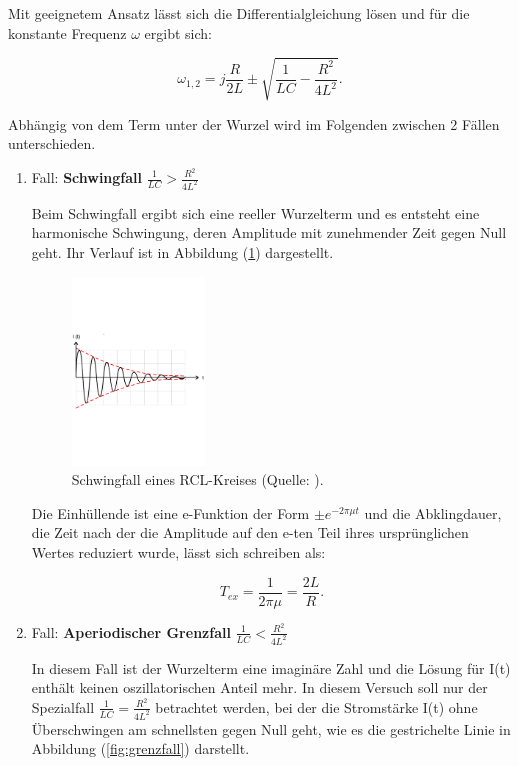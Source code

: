 \noindent
Mit geeignetem Ansatz lässt sich die Differentialgleichung lösen 
und für die konstante Frequenz $\omega$ ergibt sich:

\begin{equation}
\omega_{1,2} = j \frac{R}{2L} \pm \sqrt{\frac{1}{LC} - \frac{R^2}{4L^2}} .
\end{equation}

\noindent
Abhängig von dem Term unter der Wurzel wird im Folgenden zwischen 2 Fällen unterschieden.

\newpage
\begin{enumerate}
    \item Fall: \textbf{Schwingfall} $\frac{1}{LC} > \frac{R^2}{4L^2}$

    Beim Schwingfall ergibt sich eine reeller Wurzelterm und es entsteht eine harmonische Schwingung,
deren Amplitude mit zunehmender Zeit gegen Null geht.
Ihr Verlauf ist in Abbildung (\ref{fig:schwingfall}) dargestellt.

\begin{figure}
    \centering
       \includegraphics[height=5cm]{schwingfall.pdf}
       \caption{Schwingfall eines RCL-Kreises (Quelle: \cite{V354}).}
       \label{fig:schwingfall}
\end{figure}

Die Einhüllende ist eine e-Funktion der Form $\pm e^{-2\pi\mu t}$
und die Abklingdauer, die Zeit nach der die Amplitude auf den e-ten Teil ihres ursprünglichen Wertes reduziert wurde,
lässt sich schreiben als:

\begin{equation}
T_{ex} = \frac{1}{2\pi\mu} = \frac{2L}{R}.
\end{equation}

\item Fall: \textbf{Aperiodischer Grenzfall} $\frac{1}{LC} < \frac{R^2}{4L^2}$

In diesem Fall ist der Wurzelterm eine imaginäre Zahl und die Lösung für I(t) enthält keinen oszillatorischen Anteil mehr.
In diesem Versuch soll nur der Spezialfall $\frac{1}{LC} = \frac{R^2}{4L^2}$ betrachtet werden, 
bei der die Stromstärke I(t) ohne Überschwingen am schnellsten gegen Null geht, 
wie es die gestrichelte Linie in Abbildung (\ref{fig:grenzfall}) darstellt.


\end{enumerate}
